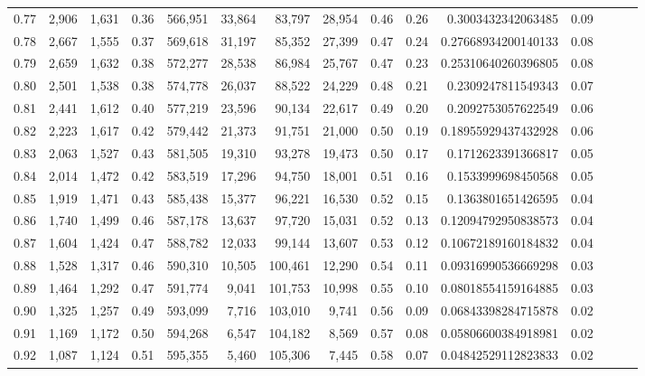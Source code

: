 \begin{tabular}{rrrrrrrrrrrrrrr}
0.77 &   2,906 &  1,631 &  0.36 &  566,951 &   33,864 &   83,797 &   28,954 &  0.46 &  0.26 &     0.3003432342063485 &      0.09 \\
0.78 &   2,667 &  1,555 &  0.37 &  569,618 &   31,197 &   85,352 &   27,399 &  0.47 &  0.24 &    0.27668934200140133 &      0.08 \\
0.79 &   2,659 &  1,632 &  0.38 &  572,277 &   28,538 &   86,984 &   25,767 &  0.47 &  0.23 &    0.25310640260396805 &      0.08 \\
0.80 &   2,501 &  1,538 &  0.38 &  574,778 &   26,037 &   88,522 &   24,229 &  0.48 &  0.21 &     0.2309247811549343 &      0.07 \\
0.81 &   2,441 &  1,612 &  0.40 &  577,219 &   23,596 &   90,134 &   22,617 &  0.49 &  0.20 &     0.2092753057622549 &      0.06 \\
0.82 &   2,223 &  1,617 &  0.42 &  579,442 &   21,373 &   91,751 &   21,000 &  0.50 &  0.19 &    0.18955929437432928 &      0.06 \\
0.83 &   2,063 &  1,527 &  0.43 &  581,505 &   19,310 &   93,278 &   19,473 &  0.50 &  0.17 &     0.1712623391366817 &      0.05 \\
0.84 &   2,014 &  1,472 &  0.42 &  583,519 &   17,296 &   94,750 &   18,001 &  0.51 &  0.16 &     0.1533999698450568 &      0.05 \\
0.85 &   1,919 &  1,471 &  0.43 &  585,438 &   15,377 &   96,221 &   16,530 &  0.52 &  0.15 &     0.1363801651426595 &      0.04 \\
0.86 &   1,740 &  1,499 &  0.46 &  587,178 &   13,637 &   97,720 &   15,031 &  0.52 &  0.13 &    0.12094792950838573 &      0.04 \\
0.87 &   1,604 &  1,424 &  0.47 &  588,782 &   12,033 &   99,144 &   13,607 &  0.53 &  0.12 &    0.10672189160184832 &      0.04 \\
0.88 &   1,528 &  1,317 &  0.46 &  590,310 &   10,505 &  100,461 &   12,290 &  0.54 &  0.11 &    0.09316990536669298 &      0.03 \\
0.89 &   1,464 &  1,292 &  0.47 &  591,774 &    9,041 &  101,753 &   10,998 &  0.55 &  0.10 &    0.08018554159164885 &      0.03 \\
0.90 &   1,325 &  1,257 &  0.49 &  593,099 &    7,716 &  103,010 &    9,741 &  0.56 &  0.09 &    0.06843398284715878 &      0.02 \\
0.91 &   1,169 &  1,172 &  0.50 &  594,268 &    6,547 &  104,182 &    8,569 &  0.57 &  0.08 &    0.05806600384918981 &      0.02 \\
0.92 &   1,087 &  1,124 &  0.51 &  595,355 &    5,460 &  105,306 &    7,445 &  0.58 &  0.07 &    0.04842529112823833 &      0.02 \\

\end{tabular}
